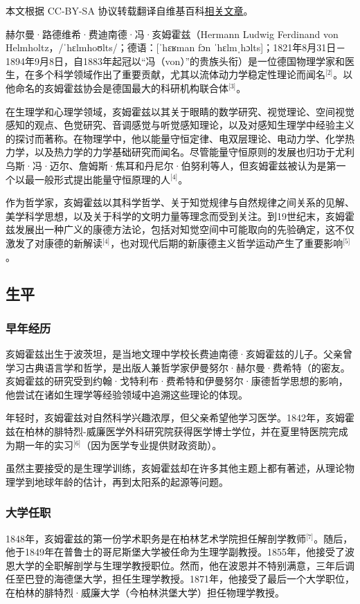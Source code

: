 
本文根据 CC-BY-SA 协议转载翻译自维基百科\href{https://en.wikipedia.org/wiki/Hermann_von_Helmholtz}{相关文章}。

赫尔曼·路德维希·费迪南德·冯·亥姆霍兹（Hermann Ludwig Ferdinand von Helmholtz，/ˈhɛlmhoʊlts/；德语：[ˈhɛʁman fɔn ˈhɛlmˌhɔlts]；1821年8月31日－1894年9月8日，自1883年起冠以“冯（von）”的贵族头衔）是一位德国物理学家和医生，在多个科学领域作出了重要贡献，尤其以流体动力学稳定性理论而闻名\(^\text{[2]}\)。以他命名的亥姆霍兹协会是德国最大的科研机构联合体\(^\text{[3]}\)。

在生理学和心理学领域，亥姆霍兹以其关于眼睛的数学研究、视觉理论、空间视觉感知的观点、色觉研究、音调感觉与听觉感知理论，以及对感知生理学中经验主义的探讨而著称。在物理学中，他以能量守恒定律、电双层理论、电动力学、化学热力学，以及热力学的力学基础研究而闻名。尽管能量守恒原则的发展也归功于尤利乌斯·冯·迈尔、詹姆斯·焦耳和丹尼尔·伯努利等人，但亥姆霍兹被认为是第一个以最一般形式提出能量守恒原理的人\(^\text{[4]}\)。

作为哲学家，亥姆霍兹以其科学哲学、关于知觉规律与自然规律之间关系的见解、美学科学思想，以及关于科学的文明力量等理念而受到关注。到19世纪末，亥姆霍兹发展出一种广义的康德方法论，包括对知觉空间中可能取向的先验确定，这不仅激发了对康德的新解读\(^\text{[4]}\)，也对现代后期的新康德主义哲学运动产生了重要影响\(^\text{[5]}\)。
\subsection{生平}
\subsubsection{早年经历}
亥姆霍兹出生于波茨坦，是当地文理中学校长费迪南德·亥姆霍兹的儿子。父亲曾学习古典语言学和哲学，是出版人兼哲学家伊曼努尔·赫尔曼·费希特（的密友。亥姆霍兹的研究受到约翰·戈特利布·费希特和伊曼努尔·康德哲学思想的影响，他尝试在诸如生理学等经验领域中追溯这些理论的体现。

年轻时，亥姆霍兹对自然科学兴趣浓厚，但父亲希望他学习医学。1842年，亥姆霍兹在柏林的腓特烈-威廉医学外科研究院获得医学博士学位，并在夏里特医院完成为期一年的实习\(^\text{[6]}\)（因为医学专业提供财政资助）。

虽然主要接受的是生理学训练，亥姆霍兹却在许多其他主题上都有著述，从理论物理学到地球年龄的估计，再到太阳系的起源等问题。
\subsubsection{大学任职}
1848年，亥姆霍兹的第一份学术职务是在柏林艺术学院担任解剖学教师\(^\text{[7]}\)。随后，他于1849年在普鲁士的哥尼斯堡大学被任命为生理学副教授。1855年，他接受了波恩大学的全职解剖学与生理学教授职位。然而，他在波恩并不特别满意，三年后调任至巴登的海德堡大学，担任生理学教授。1871年，他接受了最后一个大学职位，在柏林的腓特烈·威廉大学（今柏林洪堡大学）担任物理学教授。
